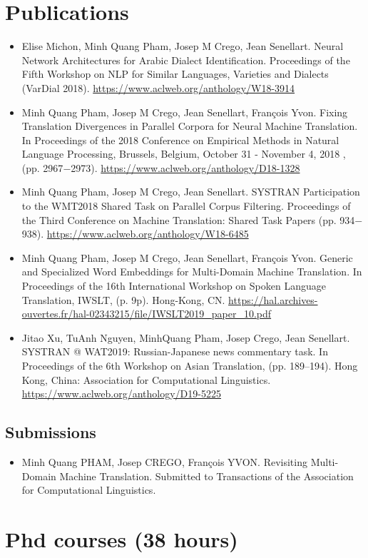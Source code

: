 \documentclass[11pt, letterpaper]{article}
\begin{document}
\section*{Publications}
\begin{itemize}
	\item Elise Michon, Minh Quang Pham, Josep M Crego, Jean Senellart. Neural Network Architectures for Arabic Dialect Identification. Proceedings of the Fifth Workshop on NLP for Similar Languages, Varieties and Dialects (VarDial 2018). \url{https://www.aclweb.org/anthology/W18-3914}
	\item Minh Quang Pham, Josep M Crego, Jean Senellart, François Yvon. Fixing Translation Divergences in Parallel Corpora for Neural Machine Translation. In Proceedings of the 2018 Conference on Empirical Methods in Natural Language Processing, Brussels, Belgium, October 31 - November 4, 2018 , (pp. 2967$-$2973). \url{https://www.aclweb.org/anthology/D18-1328}
	\item Minh Quang Pham, Josep M Crego, Jean Senellart. SYSTRAN Participation to the WMT2018 Shared Task on Parallel Corpus Filtering. Proceedings of the Third Conference on Machine Translation: Shared Task Papers (pp. 934$-$938). \url{https://www.aclweb.org/anthology/W18-6485}
	\item Minh Quang Pham, Josep M Crego, Jean Senellart, François Yvon. Generic and Specialized Word Embeddings for Multi-Domain Machine Translation. In Proceedings of the 16th International Workshop on Spoken Language Translation, IWSLT, (p. 9p). Hong-Kong, CN. \url{https://hal.archives-ouvertes.fr/hal-02343215/file/IWSLT2019_paper_10.pdf}
	\item Jitao Xu, TuAnh Nguyen, MinhQuang Pham, Josep Crego, Jean Senellart. SYSTRAN @ WAT2019: Russian-Japanese news commentary task. In Proceedings of the 6th Workshop on Asian Translation, (pp. 189–194). Hong Kong, China: Association for Computational Linguistics. \url{https://www.aclweb.org/anthology/D19-5225}
\end{itemize}
\subsection*{Submissions}
\begin{itemize}
	\item Minh Quang PHAM, Josep CREGO, François YVON. Revisiting Multi-Domain Machine Translation. Submitted to Transactions of the Association for Computational Linguistics.
\end{itemize}
\section*{Phd courses (38 hours)}
\end{document}
